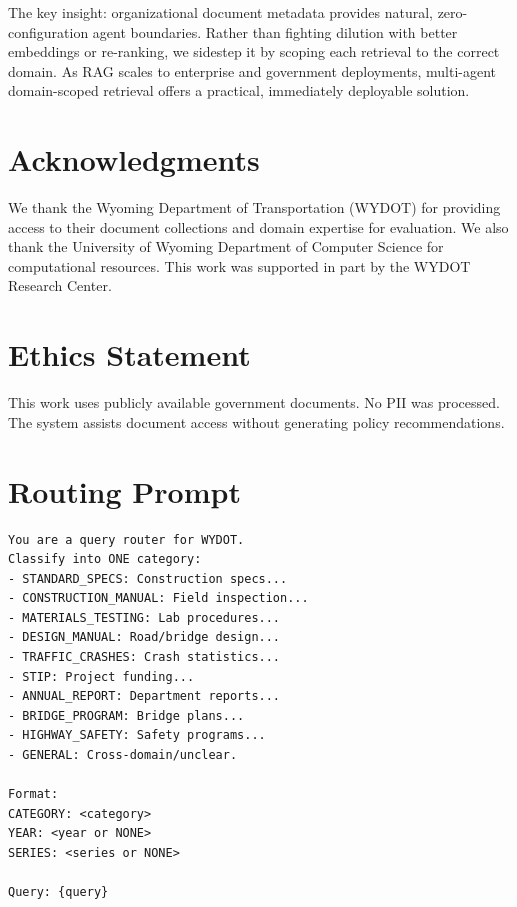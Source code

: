 \documentclass[11pt,a4paper]{article}
\begin{document}
The key insight: organizational document metadata provides natural, zero-configuration agent boundaries. Rather than fighting dilution with better embeddings or re-ranking, we sidestep it by scoping each retrieval to the correct domain. As RAG scales to enterprise and government deployments, multi-agent domain-scoped retrieval offers a practical, immediately deployable solution.


\section*{Acknowledgments}
We thank the Wyoming Department of Transportation (WYDOT) for providing access to their document collections and domain expertise for evaluation. We also thank the University of Wyoming Department of Computer Science for computational resources. This work was supported in part by the WYDOT Research Center.

\section*{Ethics Statement}
This work uses publicly available government documents. No PII was processed. The system assists document access without generating policy recommendations.




\appendix

\section{Routing Prompt}
\label{app:routing_prompt}

\begin{lstlisting}[basicstyle=\ttfamily\scriptsize]
You are a query router for WYDOT.
Classify into ONE category:
- STANDARD_SPECS: Construction specs...
- CONSTRUCTION_MANUAL: Field inspection...
- MATERIALS_TESTING: Lab procedures...
- DESIGN_MANUAL: Road/bridge design...
- TRAFFIC_CRASHES: Crash statistics...
- STIP: Project funding...
- ANNUAL_REPORT: Department reports...
- BRIDGE_PROGRAM: Bridge plans...
- HIGHWAY_SAFETY: Safety programs...
- GENERAL: Cross-domain/unclear.

Format:
CATEGORY: <category>
YEAR: <year or NONE>
SERIES: <series or NONE>

Query: {query}
\end{lstlisting}
\end{document}
